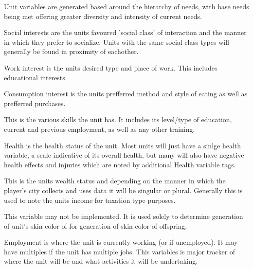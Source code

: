 



Unit variables are generated based around the hierarchy of needs, with base needs being met offering greater diversity and intensity of current needs.  

Social interests are the units favoured 'social class' of interaction and the manner in which they prefer to socialize. Units with the same social class types will generally be found in proximity of eachother.

Work interest is the units desired type and place of work. This includes educational interests.

Consumption interest is the units prefferred method and style of eating as well as prefferred purchases. 

This is the various skills the unit has. It includes its level/type of education, current and previous employment, as well as any other training.

Health is the health status of the unit. Most units will just have a sinlge health variable, a scale indicative of its overall health, but many will also have negative health effects and injuries which are noted by additional Health variable tags.

This is the units wealth status and depending on the manner in which the player's city collects and uses data it will be singular or plural. Generally this is used to note the units income for taxation type purposes.

This variable may not be implemented. It is used solely to determine generation of unit's skin color of for generation of skin color of offspring.

Employment is where the unit is currently working (or if unemployed). It may have multiples if the unit has multiple jobs. This variables is major tracker of where the unit will be and what activities it will be undertaking.

\StartSubsection {}


